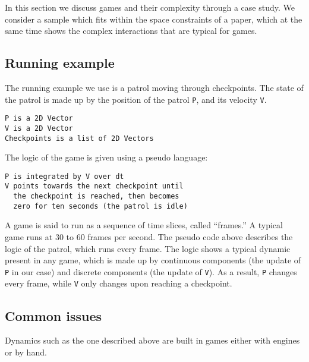 In this section we discuss games and their complexity through a case study. We consider a sample which fits within the space constraints of a paper, which at the same time shows the complex interactions that are typical for games.

\subsection{Running example}
The running example we use is a patrol moving through checkpoints. The state of the patrol is made up by the position of the patrol \texttt{P}, and its velocity \texttt{V}.
\begin{lstlisting}
P is a 2D Vector
V is a 2D Vector
Checkpoints is a list of 2D Vectors
\end{lstlisting}
The logic of the game is given using a pseudo language:
\begin{lstlisting}
P is integrated by V over dt
V points towards the next checkpoint until
  the checkpoint is reached, then becomes
  zero for ten seconds (the patrol is idle)
\end{lstlisting}

A game is said to run as a sequence of time slices, called ``frames.'' A typical game runs at 30 to 60 frames per second. The pseudo code above describes the logic of the patrol, which runs every frame. The logic shows a typical dynamic present in any game, which is made up by continuous components (the update of \texttt{P} in our case) and discrete components (the update of \texttt{V}). As a result, \texttt{P} changes every frame, while \texttt{V} only changes upon reaching a checkpoint.

\subsection{Common issues}
Dynamics such as the one described above are built in games either with engines or by hand.
